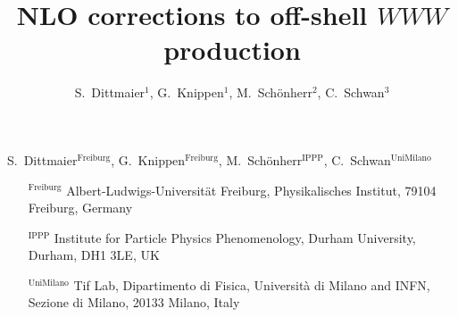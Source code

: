 \begin{flushleft}
  S.~Dittmaier$^\text{Freiburg}$,
  G.~Knippen$^\text{Freiburg}$,
  M.~Sch{\"o}nherr$^\text{IPPP}$,
  C.~Schwan$^\text{UniMilano}$
\end{flushleft}

\begin{itemize}
\item[$^\text{Freiburg}$] Albert-Ludwigs-Universit{\"a}t Freiburg, Physikalisches Institut, 79104 Freiburg, Germany
\item[$^\text{IPPP}$] Institute for Particle Physics Phenomenology, Durham University, Durham, DH1 3LE, UK
\item[$^\text{UniMilano}$] Tif Lab, Dipartimento di Fisica, Universit{\`a} di Milano and INFN, Sezione di Milano, 20133 Milano, Italy
\end{itemize}


\title{NLO corrections to off-shell $WWW$ production}
\author{
  S.~Dittmaier$^{1}$,
  G.~Knippen$^{1}$,
  M.~Sch{\"o}nherr$^{2}$,
  C.~Schwan$^{3}$
}

